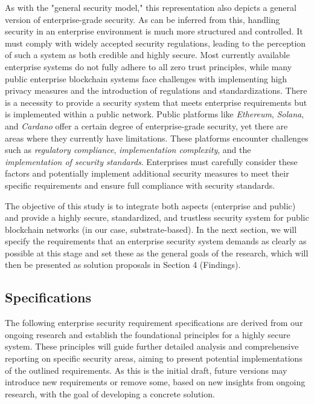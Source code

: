As with the "general security model," this representation also depicts a general version of enterprise-grade security. As can be inferred from this, handling security in an enterprise environment is much more structured and controlled. It must comply with widely accepted security regulations, leading to the perception of such a system as both credible and highly secure.
Most currently available enterprise systems do not fully adhere to all zero trust principles, while many public enterprise blockchain systems face challenges with implementing high privacy measures and the introduction of regulations and standardizations. There is a necessity to provide a security system that meets enterprise requirements but is implemented within a public network. Public platforms like \textit{Ethereum}, \textit{Solana}, and \textit{Cardano} offer a certain degree of enterprise-grade security, yet there are areas where they currently have limitations. These platforms encounter challenges such as \textit{regulatory compliance}, \textit{implementation complexity}, and the \textit{implementation of security standards}. Enterprises must carefully consider these factors and potentially implement additional security measures to meet their specific requirements and ensure full compliance with security standards.

The objective of this study is to integrate both aspects (enterprise and public) and provide a highly secure, standardized, and trustless security system for public blockchain networks (in our case, substrate-based). In the next section, we will specify the requirements that an enterprise security system demands as clearly as possible at this stage and set these as the general goals of the research, which will then be presented as solution proposals in Section 4 (Findings).

\subsection{Specifications}
The following enterprise security requirement specifications are derived from our ongoing research and establish the foundational principles for a highly secure system. These principles will guide further detailed analysis and comprehensive reporting on specific security areas, aiming to present potential implementations of the outlined requirements. As this is the initial draft, future versions may introduce new requirements or remove some, based on new insights from ongoing research, with the goal of developing a concrete solution.

